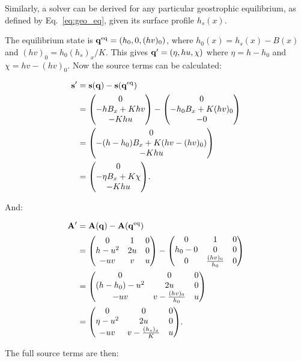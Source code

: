 Similarly, a solver can be derived for any particular geostrophic equilibrium, as defined by Eq.~\ref{eq:geo_eq}, given its surface profile $h_s(x)$.

The equilibrium state is $\vb q^\mathrm{eq} = (h_0, 0, (hv)_0)$, where $h_0(x) = h_s(x) - B(x)$ and $(hv)_0 = h_0 (h_s)_x / K$. This gives $\vb q' = (\eta, hu, \chi)$ where $\eta = h - h_0$ and $\chi = hv - (hv)_0$. Now the source terms can be calculated:

\begin{align}
  \vb s' &= \vb s(\vb q) - \vb s(\eq{\vb q}) \\
  &= \mqty(0 \\ -h B_x + K h v \\ - K h u) - \mqty(0 \\ -h_0 B_x + K (hv)_0 \\ - 0) \\
  &= \mqty(0 \\ -(h-h_0) B_x + K (hv - (hv)_0) \\ - K h u) \\
  &= \mqty(0 \\ -\eta B_x + K \chi \\ - K h u).
\end{align}

And:

\begin{align}
  \vb A' &= \vb A(\vb q) - \vb A(\eq{\vb q}) \\
  &= \mqty(
    0 & 1 & 0 \\
    h - u^2 & 2u & 0 \\
    -uv & v & u
  ) - \mqty(
    0 & 1 & 0 \\
    h_0 - 0 & 0 & 0 \\
    0 & \frac{(hv)_0}{h_0} & 0
  ) \\
  &= \mqty(
    0 & 0 & 0 \\
    (h - h_0) - u^2 & 2u & 0 \\
    -uv & v - \frac{(hv)_0}{h_0} & u
  ) \\
  &= \mqty(
    0 & 0 & 0 \\
    \eta - u^2 & 2u & 0 \\
    -uv & v - \frac{(h_s)_x}{K} & u
  ).
\end{align}

The full source terms are then:


